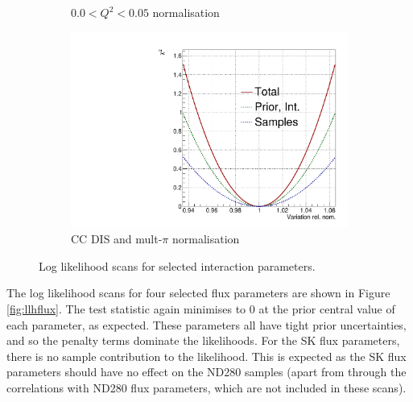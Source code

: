\begin{figure}
\begin{subfigure}{.49\textwidth}
  \caption{$0.0 < Q^2 < 0.05$ normalisation}
\end{subfigure}
\begin{subfigure}{.49\textwidth}
  \centering
  \includegraphics[width=0.7\linewidth]{figs/llh/CC_DIS_MultPi_Norm_Nubar_llh.pdf}
  \caption{CC DIS and mult-$\pi$ normalisation}
\end{subfigure}
\caption{Log likelihood scans for selected interaction parameters.}
\label{fig:llhxsec}
\end{figure}

The log likelihood scans for four selected flux parameters are shown in Figure \ref{fig:llhflux}. The test statistic again minimises to 0 at the prior central value of each parameter, as expected. These parameters all have tight prior uncertainties, and so the penalty terms dominate the likelihoods. For the SK flux parameters, there is no sample contribution to the likelihood. This is expected as the SK flux parameters should have no effect on the ND280 samples (apart from through the correlations with ND280 flux parameters, which are not included in these scans). 

